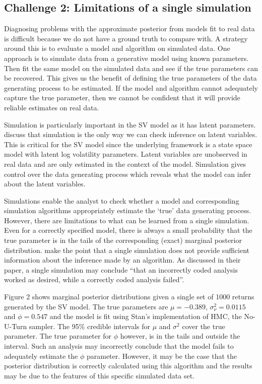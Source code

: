 \documentclass[12pt, a4paper]{article}
\begin{document}
\subsection{Challenge 2: Limitations of a single simulation}
    Diagnosing problems with the approximate posterior from models fit to real data is difficult because we do not have a ground truth to compare with. A strategy around this is to evaluate a model and algorithm on simulated data. One approach is to simulate data from a generative model using known parameters. Then fit the same model on the simulated data and see if the true parameters can be recovered. This gives us the benefit of defining the true parameters of the data generating process to be estimated. If the model and algorithm cannot adequately capture the true parameter, then we cannot be confident that it will provide reliable estimates on real data.

    Simulation is particularly important in the SV model as it has latent parameters. \citet{gelman2020bayesian} discuss that simulation is the only way we can check inference on latent variables. This is critical for the SV model since the underlying framework is a state space model with latent log volatility parameters. Latent variables are unobserved in real data and are only estimated in the context of the model. Simulation gives control over the data generating process which reveals what the model can infer about the latent variables. 

    Simulations enable the analyst to check whether a model and corresponding simulation algorithms appropriately estimate the `true' data generating process. However, there are limitations to what can be learned from a single simulation. Even for a correctly specified model, there is always a small probability that the true parameter is in the tails of the corresponding (exact) marginal posterior distribution. \cite{talts2018validating} make the point that a single simulation does not provide sufficient information about the inference made by an algorithm. As discussed in their paper, a single simulation may conclude ``that an incorrectly coded analysis worked as desired, while a correctly coded analysis failed''. 

    Figure 2 shows marginal posterior distributions given a single set of 1000 returns generated by the SV model. The true parameters are $\mu=-0.389$, $\sigma^2_{\nu}=0.0115$ and $\phi=0.547$ and the model is fit using Stan's implementation of HMC, the No-U-Turn sampler. The 95\% credible intervals for $\mu$ and $\sigma^2$ cover the true parameter. The true parameter for $\phi$ however, is in the tails and outside the interval. Such an analysis may incorrectly conclude that the model fails to adequately estimate the $\phi$ parameter. However, it may be the case that the posterior distribution is correctly calculated using this algorithm and the results may be due to the features of this specific simulated data set.
\end{document}
